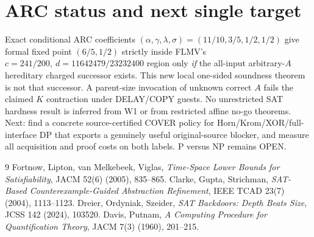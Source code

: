 \documentclass[11pt]{article}
\begin{document}
\section{ARC status and next single target}
Exact conditional ARC coefficients $(\alpha,\gamma,\lambda,\sigma)=(11/10,3/5,1/2,1/2)$ give formal fixed point $(6/5,1/2)$ strictly inside FLMV's $c=241/200,\ d=11642479/23232400$ region only \emph{if} the all-input arbitrary-$A$ hereditary charged successor exists. This new local one-sided soundness theorem is not that successor. A parent-size invocation of unknown correct $A$ fails the claimed $K$ contraction under DELAY/COPY guests. No unrestricted SAT hardness result is inferred from W1 or from restricted affine no-go theorems.
Next: find a concrete source-certified COVER policy for Horn/Krom/XOR/full-interface DP that exports a genuinely useful original-source blocker, and measure all acquisition and proof costs on both labels. P versus NP remains OPEN.
\begin{thebibliography}{9}
 Fortnow, Lipton, van Melkebeek, Viglas, \emph{Time-Space Lower Bounds for Satisfiability}, JACM 52(6) (2005), 835--865.
 Clarke, Gupta, Strichman, \emph{SAT-Based Counterexample-Guided Abstraction Refinement}, IEEE TCAD 23(7) (2004), 1113--1123.
 Dreier, Ordyniak, Szeider, \emph{SAT Backdoors: Depth Beats Size}, JCSS 142 (2024), 103520.
 Davis, Putnam, \emph{A Computing Procedure for Quantification Theory}, JACM 7(3) (1960), 201--215.
\end{thebibliography}
\end{document}
